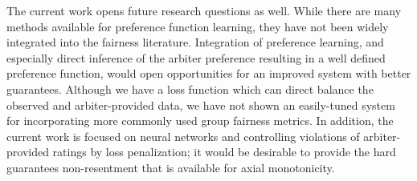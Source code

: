         The current work opens future research questions as well.  While there are many methods available for preference function learning, they  have not been widely integrated into the fairness literature.  Integration of preference learning, and especially direct inference of the arbiter preference resulting in a well defined preference function, would open opportunities for an improved system with better guarantees. Although we have a loss function which can direct balance the observed and arbiter-provided data, we have not shown an easily-tuned system for incorporating more commonly used group fairness metrics.  In addition, the current work is focused on neural networks and controlling violations of arbiter-provided ratings by loss penalization; it would be desirable to provide the hard guarantees non-resentment that is available for axial monotonicity.